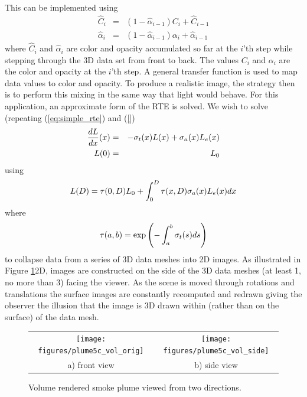 This can be implemented \cite[Chapter 39]{gpugems} using
\begin{eqnarray*}
\hat{C}_i&=&\left(1-\hat{\alpha}_{i-1}\right)C_i + \hat{C}_{i-1}\\
\hat{\alpha}_i&=&\left(1-\hat{\alpha}_{i-1}\right)\alpha_i+\hat{\alpha}_{i-1}
\end{eqnarray*}
where $\hat{C}_i$ and $\hat{\alpha}_i$ are color and opacity
accumulated so far at the $i$'th step while stepping through the
3D data set from front to back.  The values $C_i$ and $\alpha_i$
are the color and opacity at the $i$'th step.  A general transfer
function is used to map data values to color and opacity. To
produce a realistic image, the strategy then is to perform this
mixing in the same way that light would behave.  For this
application, an approximate form of the RTE is solved.  We wish to
solve (repeating (\ref{eq:simple_rte}) and (\ref{})
\begin{eqnarray}
\label{eq:simple_rtee}
\frac{dL}{dx}(x)&=&-\sigma_t(x) L(x) + \sigma_a(x) L_e(x)\\
 L(0)&=&L_0\nonumber
\end{eqnarray}
using
\begin{equation}
\label{eq:rtesoln}
 L(D)=\tau(0,D)L_0 + \int_0^D\tau(x,D)\sigma_a(x)L_e(x) dx
\end{equation}
where
\begin{equation}
\label{eq:optdepth}
\tau(a,b)=\exp\left({-\int_a^b \sigma_t(s) ds}\right)
\end{equation}
to collapse data from a series of 3D data meshes into 2D images.
As illustrated in Figure \ref{fig:volplume_example}2D, images are constructed on the side of the 3D data meshes (at
least 1, no more than 3) facing the viewer.  As the scene is moved
through rotations and translations the surface images are
constantly recomputed and redrawn giving the observer the illusion
that the image is 3D drawn within (rather than on the surface) of
the data mesh.

\begin{figure}[\figoptions]
\begin{center}
\begin{tabular}{cc}
\texttt{[image: figures/plume5c\_vol\_orig]}&
\texttt{[image: figures/plume5c\_vol\_side]}\\
a) front view&b) side view\\
\end{tabular}
\end{center}
\caption {Volume rendered smoke plume viewed from two directions.}
\label{fig:volplume_example}
\end{figure}

